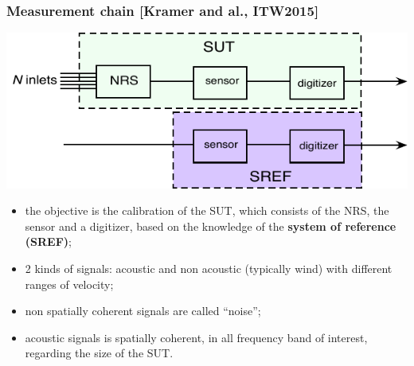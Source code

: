 \documentclass[handout,9pt]{beamer}
\begin{document}
\begin{frame}
\frametitle{Measurement chain [Kramer and al., ITW2015]}


\begin{center}
\includegraphics[scale=0.7]{fulltestbedIS26.pdf}
\end{center}



\begin{itemize}
\item
the objective is the calibration of the SUT, which consists of the NRS, the sensor and a digitizer, based on the knowledge of the 
  {\bf system of reference (SREF)};
\item
2 kinds of signals: acoustic and non acoustic (typically wind) with different ranges of velocity;
\item
non spatially coherent signals are called ``noise'';
\item
acoustic signals is spatially coherent, in all frequency band of interest, regarding the size of the SUT. 
\end{itemize}


\end{frame}
\end{document}
